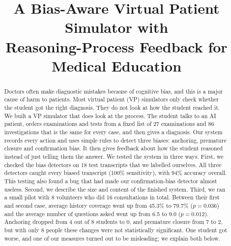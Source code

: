 \documentclass[conference]{IEEEtran}
\begin{document}
\title{A Bias-Aware Virtual Patient Simulator with\\
Reasoning-Process Feedback for Medical Education}

\author{
\and
{}
\and
{}
}

\maketitle

\begin{abstract}
Doctors often make diagnostic mistakes because of cognitive bias, and this is a
major cause of harm to patients. Most virtual patient (VP) simulators only check
whether the student got the right diagnosis. They do not look at how the student
reached it. We built a VP simulator that does look at the process. The student
talks to an AI patient, orders examinations and tests from a fixed list of 27
examinations and 86 investigations that is the same for every case, and then
gives a diagnosis. Our system records every action and uses simple rules to
detect three biases: anchoring, premature closure and confirmation bias. It then
gives feedback about how the student reasoned instead of just telling them the
answer. We tested the system in three ways. First, we checked the bias detectors
on 18 test transcripts that we labelled ourselves. All three detectors caught
every biased transcript (100\% sensitivity), with 94\% accuracy overall. This
testing also found a bug that had made our confirmation-bias detector almost
useless. Second, we describe the size and content of the finished system. Third,
we ran a small pilot with 8 volunteers who did 16 consultations in total.
Between their first and second case, average history coverage went up from
45.3\% to 79.7\% ($p=0.036$) and the average number of questions asked went up
from 6.5 to 9.0 ($p=0.012$). Anchoring dropped from 4 out of 8 students to 0,
and premature closure from 7 to 2, but with only 8 people these changes were not
statistically significant. One student got worse, and one of our measures turned
out to be misleading; we explain both below.
\end{abstract}
\end{document}
